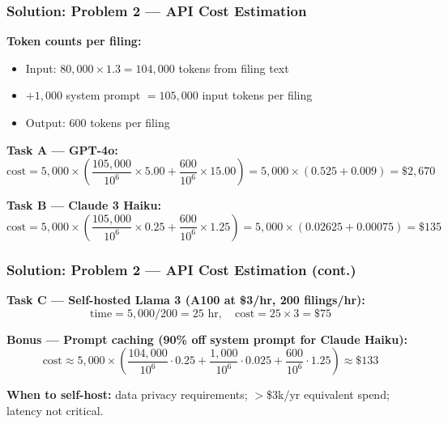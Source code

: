 \documentclass[9pt,t]{beamer}
\begin{document}
\begin{frame}
\frametitle{Solution: Problem 2 — API Cost Estimation}

\textbf{Token counts per filing:}
\begin{itemize}
  \item Input: $80{,}000 \times 1.3 = 104{,}000$ tokens from filing text
  \item $+ 1{,}000$ system prompt $= 105{,}000$ input tokens per filing
  \item Output: $600$ tokens per filing
\end{itemize}

\medskip
\textbf{Task A — GPT-4o:}
\[
\text{cost} = 5{,}000 \times \left(\frac{105{,}000}{10^6} \times 5.00
+ \frac{600}{10^6} \times 15.00\right)
= 5{,}000 \times (0.525 + 0.009) = \$2{,}670
\]

\textbf{Task B — Claude 3 Haiku:}
\[
\text{cost} = 5{,}000 \times \left(\frac{105{,}000}{10^6} \times 0.25
+ \frac{600}{10^6} \times 1.25\right)
= 5{,}000 \times (0.02625 + 0.00075) = \$135
\]
\end{frame}

\begin{frame}
\frametitle{Solution: Problem 2 --- API Cost Estimation (cont.)}

\textbf{Task C — Self-hosted Llama 3 (A100 at \$3/hr, 200 filings/hr):}
\[
\text{time} = 5{,}000/200 = 25 \text{ hr},\quad
\text{cost} = 25 \times 3 = \$75
\]

\textbf{Bonus — Prompt caching (90\% off system prompt for Claude Haiku):}
\[
\text{cost} \approx 5{,}000 \times \left(\frac{104{,}000}{10^6}{\cdot}0.25 + \frac{1{,}000}{10^6}{\cdot}0.025 + \frac{600}{10^6}{\cdot}1.25\right) \approx \$133
\]

\textbf{When to self-host:} data privacy requirements; $>$\$3k/yr equivalent spend; latency not critical.
\end{frame}
\end{document}
